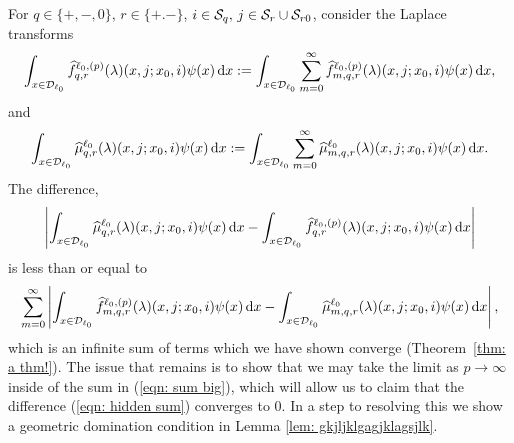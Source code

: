 
For \(q\in\{+,-,0\}\), \(r\in\{+.-\}\), \(i\in\mathcal{S}_q,\,j\in\mathcal{S}_r\cup\mathcal{S}_{r0}\), consider the Laplace transforms 
\[\int_{x\in\mathcal{D}_{\ell_0}} \widehat f^{\ell_0,(p)}_{q,r}(\lambda)(x,j;x_0,i)\psi(x)\, \mathrm{d} x := \int_{x\in\mathcal{D}_{\ell_0}} \sum_{m=0}^\infty \widehat f^{\ell_0,(p)}_{m,q,r}(\lambda)(x,j;x_0,i)\psi(x) \, \mathrm{d} x,\]
and
\[\int_{x\in\mathcal{D}_{\ell_0}} \widehat \mu^{\ell_0}_{q,r}(\lambda)( x,j;x_0,i)\psi(x) \, \mathrm{d} x := \int_{x\in\mathcal{D}_{\ell_0}} \sum_{m=0}^\infty \widehat \mu^{\ell_0}_{m,q,r}(\lambda)( x,j;x_0,i)\psi(x) \, \mathrm{d} x.\]
The difference, 
\begin{align}\left|\int_{x\in\mathcal{D}_{\ell_0}} \widehat \mu^{\ell_0}_{q,r}(\lambda)( x,j;x_0,i)\psi(x)\, \mathrm{d} x  - \int_{x\in\mathcal{D}_{\ell_0}} \widehat f^{\ell_0,(p)}_{q,r}(\lambda)(x,j;x_0,i)\psi(x) \, \mathrm{d} x \right|\label{eqn: hidden sum}\end{align}
is less than or equal to 
\begin{align}\sum_{m=0}^\infty \left| \int_{x\in\mathcal{D}_{\ell_0}} \widehat f^{\ell_0,(p)}_{m,q,r}(\lambda)(x,j;x_0,i)\psi(x)\, \mathrm{d} x - \int_{x\in\mathcal{D}_{\ell_0}}  \widehat \mu^{\ell_0}_{m,q,r}(\lambda)(x,j;x_0,i)\psi(x) \, \mathrm{d} x\right|,\label{eqn: sum big}\end{align}
which is an infinite sum of terms which we have shown converge (Theorem~\ref{thm: a thm!}). The issue that remains is to show that we may take the limit as \(p\to\infty\) inside of the sum in (\ref{eqn: sum big}), which will allow us to claim that the difference (\ref{eqn: hidden sum}) converges to 0. In a step to resolving this we show a geometric domination condition in Lemma \ref{lem: gkjljklgagjklagsjlk}.  

